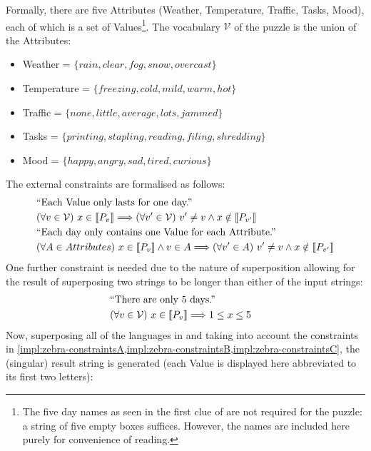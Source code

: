 \documentclass[a4paper,12pt,leqno]{article}
\begin{document}
Formally, there are five Attributes (Weather, Temperature, Traffic, Tasks, Mood), each of which is a set of Values\footnote{The five day names as seen in the first clue of  are not required for the puzzle: a string of five empty boxes suffices. However, the names are included here purely for convenience of reading.}. The vocabulary $\mathcal{V}$ of the puzzle is the union of the Attributes:
\begin{itemize}
	\item Weather = $\{rain,clear,fog,snow,overcast\}$
	\item Temperature = $\{freezing,cold,mild,warm,hot\}$
	\item Traffic = $\{none,little,average,lots,jammed\}$
	\item Tasks = $\{printing,stapling,reading,filing,shredding\}$
	\item Mood = $\{happy,angry,sad,tired,curious\}$
\end{itemize}
The external constraints are formalised as follows:
\begin{align}
	&\text{``Each Value only lasts for one day.''}\notag\\
	&(\forall v \in \mathcal{V})~ x \in \llbracket P_v \rrbracket \Longrightarrow (\forall v' \in \mathcal{V})~ v' \neq v \wedge x \notin \llbracket P_{v'} \rrbracket\label{impl:zebra-constraintsA}\\
	&\text{``Each day only contains one Value for each Attribute.''}\notag\\
	&(\forall A \in Attributes)~ x \in \llbracket P_v \rrbracket \wedge v \in A \Longrightarrow (\forall v' \in A)~ v' \neq v \wedge x \notin \llbracket P_{v'} \rrbracket\label{impl:zebra-constraintsB}
\end{align}
One further constraint is needed due to the nature of superposition allowing for the result of superposing two strings to be longer than either of the input strings:
\begin{align}
	&\text{``There are only 5 days.''}&\notag\\
	&(\forall v \in \mathcal{V})~ x \in \llbracket P_v \rrbracket \Longrightarrow 1 \leq x \leq 5\label{impl:zebra-constraintsC}
\end{align}
Now, superposing all of the languages in  and taking into account the constraints in \cref{impl:zebra-constraintsA,impl:zebra-constraintsB,impl:zebra-constraintsC}, the (singular) result string is generated (each Value is displayed here abbreviated to its first two letters):
\end{document}
